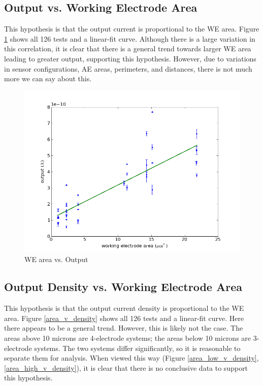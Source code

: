 \subsection{Output vs. Working Electrode Area}

This hypothesis is that the output current is proportional to the WE area. Figure \ref{area_v_output} shows all 126 tests and a linear-fit curve. Although there is a large variation in this correlation, it is clear that there is a general trend towards larger WE area leading to greater output, supporting this hypothesis. However, due to variations in sensor configurations, AE areas, perimeters, and distances, there is not much more we can say about this.

\begin{figure}
	\centering
	\includegraphics[width=0.7\linewidth]{figures/area_v_output.png}
	\caption{WE area vs. Output}
	\label{area_v_output}
\end{figure}

\subsection{Output Density vs. Working Electrode Area}

This hypothesis is that the output current density is proportional to the WE area. Figure \ref{area_v_density} shows all 126 tests and a linear-fit curve. Here there appears to be a general trend. However, this is likely not the case. The areas above 10 microns are 4-electrode systems; the areas below 10 microns are 3-electrode systems. The two systems differ significantly, so it is reasonable to separate them for analysis. When viewed this way (Figure \ref{area_low_v_density}, \ref{area_high_v_density}), it is clear that there is no conclusive data to support this hypothesis.

